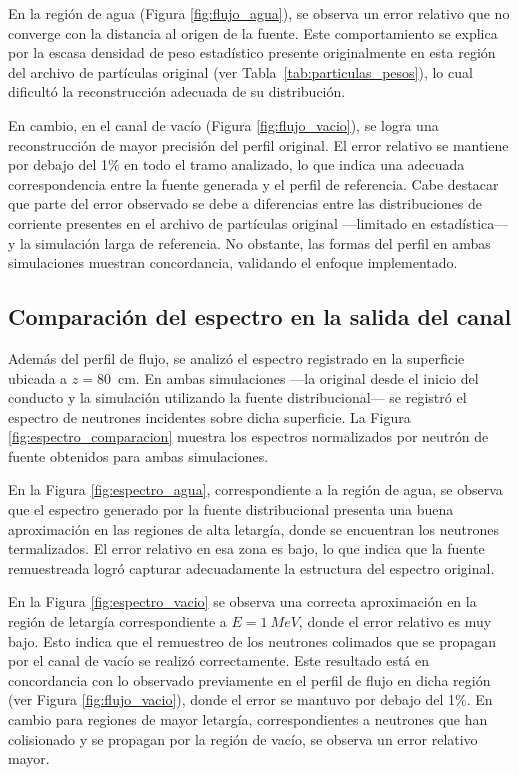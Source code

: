 En la región de agua (Figura \ref{fig:flujo_agua}), se observa un error relativo que no converge con la distancia al origen de la fuente. Este comportamiento se explica por la escasa densidad de peso estadístico presente originalmente en esta región del archivo de partículas original (ver Tabla~\ref{tab:particulas_pesos}), lo cual dificultó la reconstrucción adecuada de su distribución.

En cambio, en el canal de vacío (Figura \ref{fig:flujo_vacio}), se logra una reconstrucción de mayor precisión del perfil original. El error relativo se mantiene por debajo del 1\% en todo el tramo analizado, lo que indica una adecuada correspondencia entre la fuente generada y el perfil de referencia. Cabe destacar que parte del error observado se debe a diferencias entre las distribuciones de corriente presentes en el archivo de partículas original —limitado en estadística— y la simulación larga de referencia. No obstante, las formas del perfil en ambas simulaciones muestran concordancia, validando el enfoque implementado.

\subsection{Comparación del espectro en la salida del canal}

Además del perfil de flujo, se analizó el espectro registrado en la superficie ubicada a $z = 80$~cm. En ambas simulaciones —la original desde el inicio del conducto y la simulación utilizando la fuente distribucional— se registró el espectro de neutrones incidentes sobre dicha superficie. La Figura \ref{fig:espectro_comparacion} muestra los espectros normalizados por neutrón de fuente obtenidos para ambas simulaciones. 

En la Figura \ref{fig:espectro_agua}, correspondiente a la región de agua, se observa que el espectro generado por la fuente distribucional presenta una buena aproximación en las regiones de alta letargía, donde se encuentran los neutrones termalizados. El error relativo en esa zona es bajo, lo que indica que la fuente remuestreada logró capturar adecuadamente la estructura del espectro original.

En la Figura \ref{fig:espectro_vacio} se observa una correcta aproximación en la región de letargía correspondiente a $E = 1~MeV$, donde el error relativo es muy bajo. Esto indica que el remuestreo de los neutrones colimados que se propagan por el canal de vacío se realizó correctamente. Este resultado está en concordancia con lo observado previamente en el perfil de flujo en dicha región (ver Figura \ref{fig:flujo_vacio}), donde el error se mantuvo por debajo del 1\%. En cambio para regiones de mayor letargía, correspondientes a neutrones que han colisionado y se propagan por la región de vacío, se observa un error relativo mayor. 

